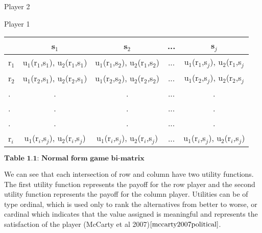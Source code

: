 \documentclass{article}
\begin{document}
\begin{center}
Player 2

Player 1
\begin{tabular}{|l|c|c|c|c|}
\hline
& s$_1$ & s$_2$ & ... & s$_j$\\ 
\hline
r$_1$ & u$_1$(r$_1$,s$_1$), u$_2$(r$_1$,s$_1$) & u$_1$(r$_1$,s$_2$), u$_2$(r$_1$,s$_2$) & ... &  u$_1$(r$_1$,s$_j$), u$_2$(r$_1$,s$_j$\\
\hline
r$_2$ & u$_1$(r$_2$,s$_1$), u$_2$(r$_2$,s$_1$) & u$_1$(r$_2$,s$_2$), u$_2$(r$_2$,s$_2$) & ... &  u$_1$(r$_2$,s$_j$), u$_2$(r$_2$,s$_j$\\
\hline
. & . & . & ... & .\\
. & . & . & ... & .\\
. & . & . & ... & .\\
\hline
r$_i$ & u$_1$(r$_i$,s$_j$), u$_2$(r$_i$,s$_j$) & u$_1$(r$_i$,s$_j$), u$_2$(r$_i$,s$_j$) & ... &  u$_1$(r$_i$,s$_j$), u$_2$(r$_i$,s$_j$)\\
\hline
\end{tabular}



$\textbf{Table 1.1: Normal form game bi-matrix}$
\end{center}

We can see that each intersection of row and column have two utility functions. The first utility function represents the payoff for the row player and the second utility function represents the payoff for the column player. Utilities can be of type ordinal, which is used only to rank the alternatives from better to worse, or cardinal which indicates that the value assigned is meaningful and represents the satisfaction of the player (McCarty et al 2007)$\cite{mccarty2007political}$.
\end{document}
